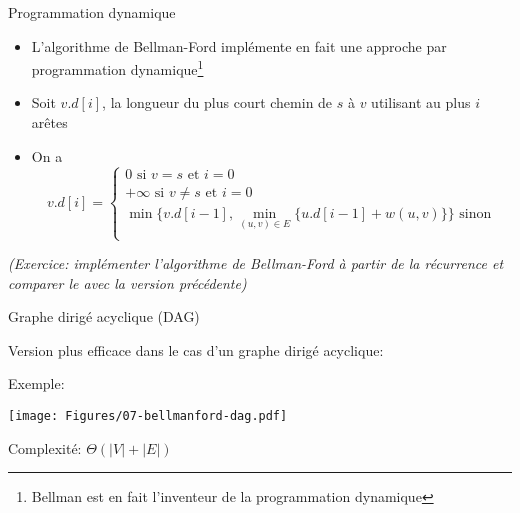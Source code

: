 \begin{frame}{Programmation dynamique}

\begin{itemize}
\item L'algorithme de Bellman-Ford implémente en fait une approche par
  programmation dynamique\footnote{Bellman est en fait l'inventeur de la programmation dynamique}
\item Soit $v.d[i]$, la longueur du plus court chemin de $s$ à $v$ utilisant au plus $i$ arêtes
\item On a
{\footnotesize
\[v.d[i]=\left\{\begin{array}{l}
0 \mbox{   si }v=s\mbox{ et }i=0\\
+\infty \mbox{   si }v\neq s\mbox{ et }i=0\\
\min\{v.d[i-1],\min_{(u,v)\in E}\{u.d[i-1]+w(u,v)\}\} \mbox{   sinon}\\
  \end{array}\right.\]}
\end{itemize}

\bigskip

{\it (Exercice: implémenter l'algorithme de Bellman-Ford à partir de
  la récurrence et comparer le avec la version précédente)}

\end{frame}

\begin{frame}{Graphe dirigé acyclique (DAG)}

Version plus efficace dans le cas d'un graphe dirigé acyclique:
\begin{center}
{\small
{}}
\end{center}

\bigskip

Exemple:
\centerline{\texttt{[image: Figures/07-bellmanford-dag.pdf]}}

\bigskip

Complexité: $\Theta(|V|+|E|)$

\end{frame}

